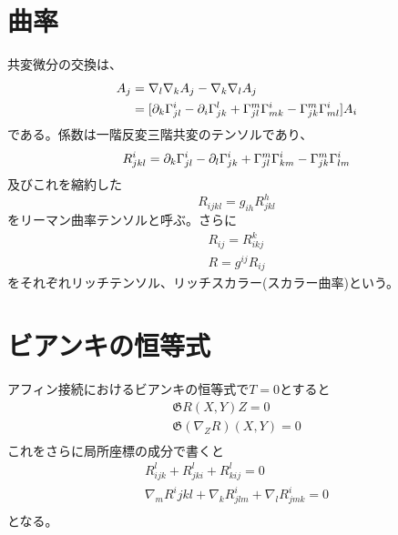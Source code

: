 \section{曲率}
    共変微分の交換は、
    \begin{align*}
        [\na_l,\na_k]A_j &= \na_l\na_kA_j-\na_k\na_lA_j\\
        &= [\pa_k\Ga^i_{jl}-\pa_i\Ga^l_{jk}
        +\Ga^m_{jl}\Ga^i_{mk}-\Ga^m_{jk}\Ga^i_{ml}]A_i
    \end{align*}
    である。係数は一階反変三階共変のテンソルであり、
        \[R^i_{jkl}
        =\partial_k\Gamma^i_{jl}-\partial_l\Gamma^i_{jk}
        +\Gamma^m_{jl}\Gamma^i_{km}-\Gamma^m_{jk}\Gamma^i_{lm}\]
    及びこれを縮約した
        \[R_{ijkl} = g_{ih}R^h_{jkl}\]
    をリーマン曲率テンソルと呼ぶ。さらに
    \begin{gather*}
        R_{ij} = R^k_{ikj}\\
        R = g^{ij}R_{ij}
    \end{gather*}
    をそれぞれリッチテンソル、リッチスカラー(スカラー曲率)という。


\section{ビアンキの恒等式}
    アフィン接続におけるビアンキの恒等式で$T = 0$とすると
    \begin{gather*}
        \mathfrak{G}{R(X, Y)Z} = 0\\
        \mathfrak{G}{(\nabla_ZR)(X, Y)} = 0\\
    \end{gather*}
    これをさらに局所座標の成分で書くと
    \begin{gather*}
        R^l_{ijk} + R^l_{jki} + R^l_{kij} = 0\\
        \nabla_mR^i{jkl} + \nabla_kR^i_{jlm} + \nabla_lR^i_{jmk} = 0\\
    \end{gather*}
    となる。

